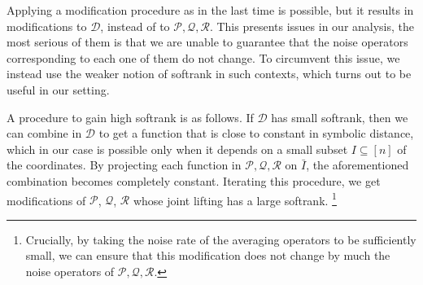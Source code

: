\documentclass[11pt]{article}
\begin{document}
\begin{enumerate}
    
    Applying a modification procedure as in the last time is possible, but it results in modifications to $\mathcal{D}$, instead of to  $\mathcal{P},\mathcal{Q},\mathcal{R}$. This presents issues in our analysis, the most serious of them is that we are unable to guarantee that the noise operators corresponding to each one of them do not change. %
    To circumvent this issue, we instead use the weaker notion of softrank in such contexts, which turns out to be useful in our setting. 
    
    A procedure to gain high softrank is as follows. If $\mathcal{D}$ has small softrank, then we can combine in $\mathcal{D}$ to get a function that is close to constant in symbolic distance, which in our case is possible only when it depends on a small subset  $I\subseteq [n]$ of the coordinates. By projecting each function in $\mathcal{P},\mathcal{Q},\mathcal{R}$ on $\bar{I}$, the aforementioned combination becomes completely constant. Iterating this procedure, we get modifications of $\mathcal{P}$, $\mathcal{Q}$, $\mathcal{R}$ whose joint lifting has a large softrank.
    \footnote{Crucially, by taking the noise rate of the averaging operators to be sufficiently small, we can ensure that this modification does not change by much the noise operators of $\mathcal{P},\mathcal{Q},\mathcal{R}$.}
\end{enumerate}
\end{document}
